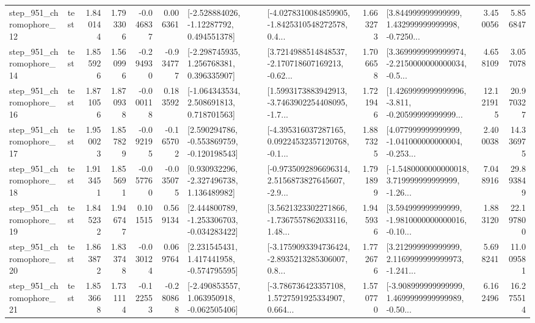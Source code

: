 \begin{tabular}{llrrrrllrlrr}
  step\_951\_chromophore\_12 &      test &      1.840144 &    1.793306 &     -0.046837 &  0.006361 &    [-2.528884026, -1.12287792, 0.494551378] &  [-4.0278310084859905, -1.8425310548272578, 0.4... &       1.663273 &  [3.844999999999999, 1.432999999999998, -0.7250... &            3.450056 &          5.856847 \\
  step\_951\_chromophore\_14 &      test &      1.855926 &    1.560996 &     -0.294930 & -0.934777 &    [-2.298745935, 1.256768381, 0.396335907] &  [3.7214988514848537, -2.170718607169213, -0.62... &       1.706658 &  [3.3699999999999974, -2.2150000000000034, -0.5... &            4.658109 &          3.057078 \\
  step\_951\_chromophore\_16 &      test &      1.871056 &    1.870938 &     -0.000118 &  0.183592 &    [-1.064343534, 2.508691813, 0.718701563] &  [1.5993173883942913, -3.7463902254408095, -1.7... &       1.721946 &  [1.4269999999999996, -3.811, -0.20599999999999... &           12.121915 &         20.970327 \\
  step\_951\_chromophore\_17 &      test &      1.950023 &    1.857829 &     -0.092195 & -0.165702 &   [2.590294786, -0.553869759, -0.120198543] &  [-4.395316037287165, 0.09224532357120768, -0.1... &       1.887325 &  [4.077999999999999, -1.041000000000004, -0.253... &            2.400038 &         14.336975 \\
  step\_951\_chromophore\_18 &      test &      1.913451 &    1.855691 &     -0.057760 & -0.035075 &    [0.930932296, -2.327496738, 1.136489982] &  [-0.9735092896696314, 2.5156873827645607, -2.9... &       1.791899 &  [-1.5480000000000018, 3.719999999999999, -1.26... &            7.048916 &         29.893849 \\
  step\_951\_chromophore\_19 &      test &      1.845232 &    1.946747 &      0.101515 &  0.569134 &   [2.444800789, -1.253306703, -0.034283422] &  [3.5621323302271866, -1.7367557862033116, 1.48... &       1.945936 &  [3.594999999999999, -1.9810000000000016, -0.10... &            1.883120 &         22.197800 \\
  step\_951\_chromophore\_20 &      test &      1.863872 &    1.833748 &     -0.030124 &  0.069764 &    [2.231545431, 1.417441958, -0.574795595] &  [-3.1759093394736424, -2.8935213285306007, 0.8... &       1.772676 &  [3.212999999999999, 2.1169999999999973, -1.241... &            5.698241 &         11.009581 \\
  step\_951\_chromophore\_21 &      test &      1.853668 &    1.731114 &     -0.122553 & -0.280868 &   [-2.490853557, 1.063950918, -0.062505406] &  [-3.786736423357108, 1.5727591925334907, 0.664... &       1.570770 &  [-3.908999999999999, 1.4699999999999989, -0.50... &            6.162496 &         16.275514 \\

\end{tabular}
